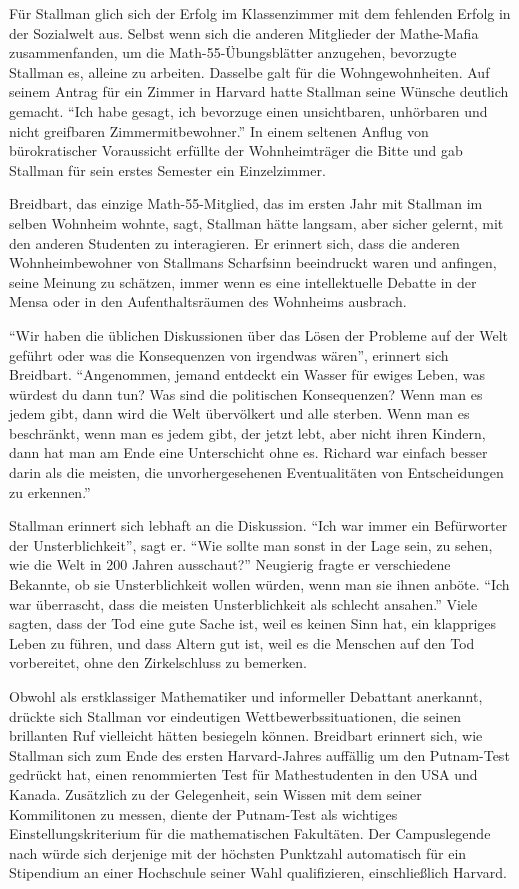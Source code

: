 Für Stallman glich sich der Erfolg im Klassenzimmer mit dem fehlenden Erfolg in der Sozialwelt aus. Selbst wenn sich die anderen Mitglieder der Mathe-Mafia zusammenfanden, um die Math-55-Übungsblätter anzugehen, bevorzugte Stallman es, alleine zu arbeiten. Dasselbe galt für die Wohngewohnheiten. Auf seinem Antrag für ein Zimmer in Harvard hatte Stallman seine Wünsche deutlich gemacht. "`Ich habe gesagt, ich bevorzuge einen unsichtbaren, unhörbaren und nicht greifbaren Zimmermitbewohner."' In einem seltenen Anflug von bürokratischer Voraussicht erfüllte der Wohnheimträger die Bitte und gab Stallman für sein erstes Semester ein Einzelzimmer.

Breidbart, das einzige Math-55-Mitglied, das im ersten Jahr mit Stallman im selben Wohnheim wohnte, sagt, Stallman hätte langsam, aber sicher gelernt, mit den anderen Studenten zu interagieren. Er erinnert sich, dass die anderen Wohnheimbewohner von Stallmans Scharfsinn beeindruckt waren und anfingen, seine Meinung zu schätzen, immer wenn es eine intellektuelle Debatte in der Mensa oder in den Aufenthaltsräumen des Wohnheims ausbrach.

"`Wir haben die üblichen Diskussionen über das Lösen der Probleme auf der Welt geführt oder was die Konsequenzen von irgendwas wären"', erinnert sich Breidbart. "`Angenommen, jemand entdeckt ein Wasser für ewiges Leben, was würdest du dann tun? Was sind die politischen Konsequenzen? Wenn man es jedem gibt, dann wird die Welt übervölkert und alle sterben. Wenn man es beschränkt, wenn man es jedem gibt, der jetzt lebt, aber nicht ihren Kindern, dann hat man am Ende eine Unterschicht ohne es. Richard war einfach besser darin als die meisten, die unvorhergesehenen Eventualitäten von Entscheidungen zu erkennen."'

Stallman erinnert sich lebhaft an die Diskussion. "`Ich war immer ein Befürworter der Unsterblichkeit"', sagt er. "`Wie sollte man sonst in der Lage sein, zu sehen, wie die Welt in 200 Jahren ausschaut?"' Neugierig fragte er verschiedene Bekannte, ob sie Unsterblichkeit wollen würden, wenn man sie ihnen anböte. "`Ich war überrascht, dass die meisten Unsterblichkeit als schlecht ansahen."' Viele sagten, dass der Tod eine gute Sache ist, weil es keinen Sinn hat, ein klappriges Leben zu führen, und dass Altern gut ist, weil es die Menschen auf den Tod vorbereitet, ohne den Zirkelschluss zu bemerken.

Obwohl als erstklassiger Mathematiker und informeller Debattant anerkannt, drückte sich Stallman vor eindeutigen Wettbewerbssituationen, die seinen brillanten Ruf vielleicht hätten besiegeln können. Breidbart erinnert sich, wie Stallman sich zum Ende des ersten Harvard-Jahres auffällig um den Putnam-Test gedrückt hat, einen renommierten Test für Mathestudenten in den USA und Kanada. Zusätzlich zu der Gelegenheit, sein Wissen mit dem seiner Kommilitonen zu messen, diente der Putnam-Test als wichtiges Einstellungskriterium für die mathematischen Fakultäten. Der Campuslegende nach würde sich derjenige mit der höchsten Punktzahl automatisch für ein Stipendium an einer Hochschule seiner Wahl qualifizieren, einschließlich Harvard.

